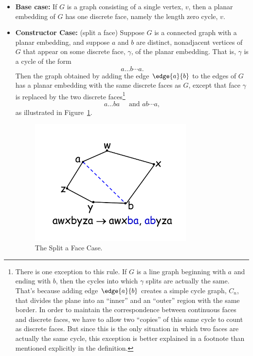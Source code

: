 \documentclass[handout]{mcs}
\begin{document}
\begin{itemize}
\item \textbf{Base case:} If $G$ is a graph consisting of a single vertex,
$v$, then a planar embedding of $G$ has one discrete face, namely the
length zero cycle, $v$.

\item \textbf{Constructor Case:} (split a face) Suppose $G$ is a
connected graph with a planar embedding, and suppose $a$ and $b$ are
distinct, nonadjacent vertices of $G$ that appear on some discrete face,
$\gamma$, of the planar embedding.  That is, $\gamma$ is a cycle of the form
\[
a \dots b \cdots a.
\]
Then the graph obtained by adding the edge $\edge{a}{b}$ to the edges of
$G$ has a planar embedding with the same discrete faces as $G$, except
that face $\gamma$ is replaced by the two discrete
faces\footnote{\label{cp7f.C} There is one exception to this rule.  If $G$ is a
line graph beginning with $a$ and ending with $b$, then the cycles into
which $\gamma$ splits are actually the same.  That's because adding edge
$\edge{a}{b}$ creates a simple cycle graph, $C_n$, that divides the plane
into an ``inner'' and an ``outer'' region with the same border.  In order
to maintain the correspondence between continuous faces and discrete
faces, we have to allow two ``copies'' of this same cycle to count as
discrete faces.  But since this is the only situation in which two faces
are actually the same cycle, this exception is better explained in a
footnote than mentioned explicitly in the definition.}
\[
a\dots ba\quad \text{ and } ab\cdots a, 
\]
as illustrated in Figure~\ref{cp7f.fig:face-splitting}.

\begin{figure}[h]
\centering \includegraphics[height=2.5in]{figures/split-a-face}
\caption{The Split a Face Case.}
\label{cp7f.fig:face-splitting}
\end{figure}


\end{itemize}
\end{document}
